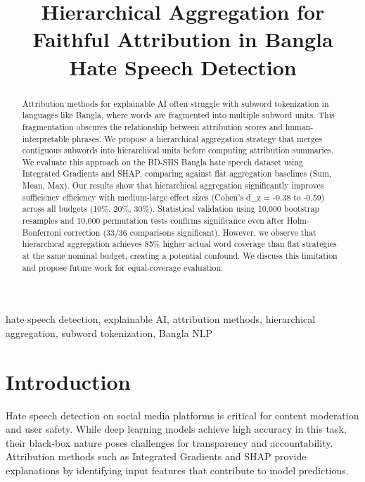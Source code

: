 \documentclass[journal]{IEEEtran}
\begin{document}
\title{Hierarchical Aggregation for Faithful Attribution in Bangla Hate Speech Detection}

\author{
}

\maketitle

\begin{abstract}
Attribution methods for explainable AI often struggle with subword tokenization in languages like Bangla, where words are fragmented into multiple subword units. This fragmentation obscures the relationship between attribution scores and human-interpretable phrases. We propose a hierarchical aggregation strategy that merges contiguous subwords into hierarchical units before computing attribution summaries. We evaluate this approach on the BD-SHS Bangla hate speech dataset using Integrated Gradients and SHAP, comparing against flat aggregation baselines (Sum, Mean, Max). Our results show that hierarchical aggregation significantly improves sufficiency efficiency with medium-large effect sizes (Cohen's d_z = -0.38 to -0.59) across all budgets (10\%, 20\%, 30\%). Statistical validation using 10,000 bootstrap resamples and 10,000 permutation tests confirms significance even after Holm-Bonferroni correction (33/36 comparisons significant). However, we observe that hierarchical aggregation achieves 85\% higher actual word coverage than flat strategies at the same nominal budget, creating a potential confound. We discuss this limitation and propose future work for equal-coverage evaluation.
\end{abstract}

\begin{IEEEkeywords}
hate speech detection, explainable AI, attribution methods, hierarchical aggregation, subword tokenization, Bangla NLP
\end{IEEEkeywords}

\section{Introduction}

Hate speech detection on social media platforms is critical for content moderation and user safety. While deep learning models achieve high accuracy in this task, their black-box nature poses challenges for transparency and accountability. Attribution methods such as Integrated Gradients \cite{IG} and SHAP \cite{SHAP} provide explanations by identifying input features that contribute to model predictions.
\end{document}
